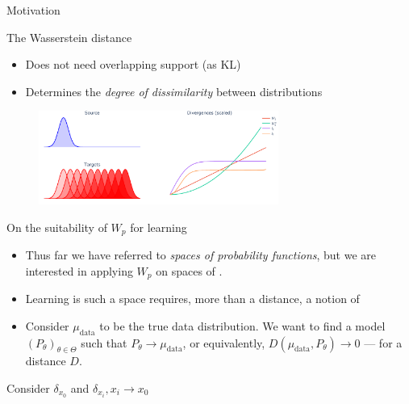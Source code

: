 \documentclass[pdf,aspectratio=169,10pt]{beamer}
\begin{document}
\begin{frame}{Motivation}
\end{frame}

\begin{frame}{The Wasserstein distance}
    \begin{itemize}
        \item Does not need overlapping support (as KL)
        \item Determines the \emph{degree of dissimilarity} between distributions
    \end{itemize}
    \begin{figure}
        \centering
            \includegraphics[trim={0 0 0 0},clip, width=0.7\textwidth]{../img/wasserstein_1d.pdf}
        \end{figure}
        \centering
        \small

\end{frame}

\begin{frame}{On the suitability of $W_p$ for learning}

\begin{itemize}
    \item Thus far we have referred to \emph{spaces of probability functions}, but we are interested in applying $W_p$ on spaces of .
    \item Learning is such a space requires, more than a distance, a notion of 
    \item Consider $\mu_\text{data}$ to be the true data distribution. We want to find a model $(P_\theta)_{\theta\in\Theta}$ such that $P_\theta \to \mu_\text{data}$, or equivalently, $D(\mu_\text{data},P_\theta)\to 0$ --- for a  distance $D$.
\end{itemize}
\vspace{2em}
\centerline{ Consider $\delta_{x_0}$ and $\delta_{x_i}, x_i\to x_0$}

\end{frame}
\end{document}
